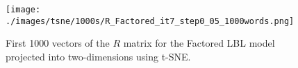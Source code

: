 
\begin{figure}[ht]
\texttt{[image: ./images/tsne/1000s/R\_Factored\_it7\_step0\_05\_1000words.png]} 
\centering
\caption{First 1000 vectors of the $R$ matrix for the Factored LBL model projected into two-dimensions using t-SNE.}
\end{figure}
